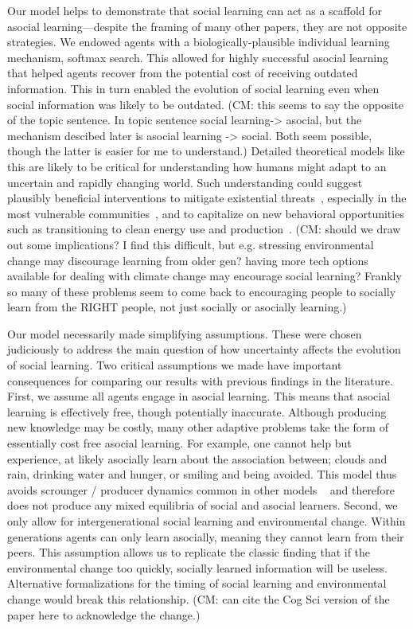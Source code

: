 \documentclass[letterpaper,11.5pt]{scrartcl}
\newcommand{\cm}[1]{{\textcolor{mypurple} {({\tiny CM:} #1)}}}
\begin{document}
Our model helps to demonstrate that social learning can act as a scaffold for asocial learning---despite the framing of many other papers, they are not opposite strategies. 
We endowed agents with a biologically-plausible individual learning mechanism, softmax search. This allowed for highly successful asocial learning that helped agents recover from the potential cost of receiving outdated information. This in turn enabled the evolution of social learning 
even when social information was likely to be outdated. \cm{this seems to say the opposite of the topic sentence. In topic sentence social learning-> asocial, but the mechanism descibed later is asocial learning -> social. Both seem possible, though the latter is easier for me to understand.}
Detailed theoretical models like this are likely to be critical for understanding how humans might adapt to an uncertain and rapidly changing world.
Such understanding could suggest plausibly beneficial interventions to mitigate existential threats~\cite{Moya2020,Jones2021}, especially in
the most vulnerable communities~\cite{McNamara2020}, and to capitalize on new behavioral opportunities such as transitioning to clean energy use and
production~\cite{NatureEnergyEditorialPromisesPremises2018,Brisbois2022}. \cm{should we draw out some implications? I find this difficult, but e.g. stressing environmental change may discourage learning from older gen? having more tech options available for dealing with climate change may encourage social learning? Frankly so many of these problems seem to come back to encouraging people to socially learn from the RIGHT people, not just socially or asocially learning.}

Our model necessarily made simplifying assumptions. These were chosen judiciously to address the main question of how uncertainty affects the evolution of social learning. Two critical assumptions we made have important consequences for comparing our results with previous findings in the literature. First, we assume all agents engage in asocial learning. This means that asocial learning is effectively free, though potentially inaccurate. Although producing new knowledge may be costly, many other adaptive problems take the form of essentially cost free asocial learning. For example, one cannot help but experience, at likely asocially learn about the association between; clouds and rain, drinking water and hunger, or smiling and being avoided. This model thus avoids scrounger / producer dynamics common in other models ~\cite{BoydRicherson1985,Rogers1988} and therefore does not produce any mixed equilibria of social and asocial learners.  Second, we only allow for intergenerational social learning and environmental change. Within generations agents can only learn asocially, meaning they cannot learn from their peers. This assumption allows us to replicate the classic finding that if the environmental change too quickly, socially learned information will be useless. Alternative formalizations for the timing of  social learning and environmental change would break this relationship. \cm{can cite the Cog Sci version of the paper here to acknowledge the change.}
\end{document}
